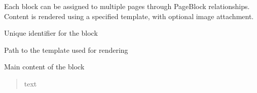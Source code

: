\documentclass[a4paper,12pt,ngerman]{sphinxmanual}
\begin{document}
\sphinxAtStartPar
Each block can be assigned to multiple pages through PageBlock relationships.
Content is rendered using a specified template, with optional image attachment.

\begin{fulllineitems}
\label{\detokenize{sections/models:pages_app.models.Block.name}}
\pysigstartsignatures
\pysigline
{}
\pysigstopsignatures
\sphinxAtStartPar
Unique identifier for the block
\begin{quote}\begin{description}
\sphinxAtStartPar
{}

\end{description}\end{quote}

\end{fulllineitems}


\begin{fulllineitems}
\label{\detokenize{sections/models:pages_app.models.Block.template}}
\pysigstartsignatures
\pysigline
{}
\pysigstopsignatures
\sphinxAtStartPar
Path to the template used for rendering
\begin{quote}\begin{description}
\sphinxAtStartPar
{}

\end{description}\end{quote}

\end{fulllineitems}


\begin{fulllineitems}
\label{\detokenize{sections/models:pages_app.models.Block.content}}
\pysigstartsignatures
\pysigline
{}
\pysigstopsignatures
\sphinxAtStartPar
Main content of the block
\begin{quote}\begin{description}
\sphinxAtStartPar
text

\end{description}\end{quote}

\end{fulllineitems}
\end{document}
